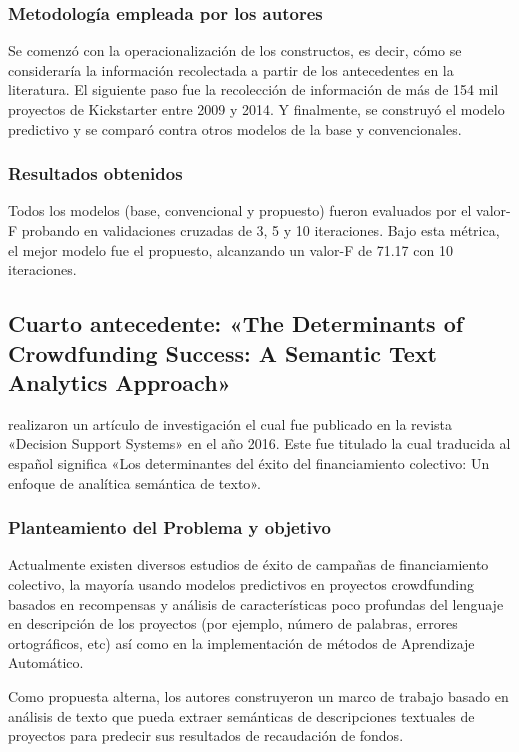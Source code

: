\subsubsection{Metodología empleada por los autores}
Se comenzó con la operacionalización de los constructos, es decir, cómo se consideraría la información recolectada a partir de los antecedentes en la literatura. El siguiente paso fue la recolección de información de más de 154 mil proyectos de Kickstarter entre 2009 y 2014. Y finalmente, se construyó el modelo predictivo y se comparó contra otros modelos de la base y convencionales.

\subsubsection{Resultados obtenidos}
Todos los modelos (base, convencional y propuesto) fueron evaluados por el valor-F probando en validaciones cruzadas de 3, 5 y 10 iteraciones. Bajo esta métrica, el mejor modelo fue el propuesto, alcanzando un valor-F de 71.17 con 10 iteraciones.


\subsection{Cuarto antecedente: «The Determinants of Crowdfunding Success: A Semantic Text Analytics Approach» \citep*{pr_yuan2016textanalytics}}
\citeauthor{pr_yuan2016textanalytics} realizaron un artículo de investigación el cual fue publicado en la revista «Decision Support Systems» en el año 2016. Este fue titulado  la cual traducida al español significa «Los determinantes del éxito del financiamiento colectivo: Un enfoque de analítica semántica de texto».

\subsubsection{Planteamiento del Problema y objetivo}
Actualmente existen diversos estudios de éxito de campañas de financiamiento colectivo, la mayoría usando modelos predictivos en proyectos crowdfunding basados en recompensas y análisis de características poco profundas del lenguaje en descripción de los proyectos (por ejemplo, número de palabras, errores ortográficos, etc) así como en la implementación de métodos de Aprendizaje Automático.

Como propuesta alterna, los autores construyeron un marco de trabajo basado en análisis de texto que pueda extraer semánticas de descripciones textuales de proyectos para predecir sus resultados de recaudación de fondos.

